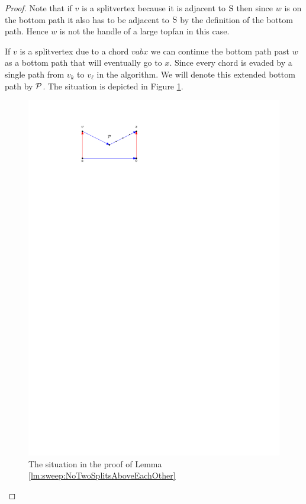  \begin{proof}
    Note that if $v$ is a splitvertex because it is adjacent to $\pS$ then since $w$ is on the bottom path it also has to be adjacent to $\pS$ by the definition of the bottom path.
    Hence $w$ is not the handle of a large topfan in this case.

    If $v$ is a splitvertex due to a chord $v a b x$ we can continue the bottom path past $w$ as a bottom path that will eventually go to $x$.
    Since every chord is evaded by a single path from $v_k$ to $v_\ell$ in the algorithm.
    We will denote this extended bottom path by $\P$.
    The situation is depicted in Figure \ref{fig:sweep:botomPathChord}.

    \begin{figure}[h]
      \centering
      \includegraphics[scale=1]{unifiedAlgo/img/sweep/bottompathChord.pdf}
      \caption{The situation in the proof of Lemma \ref{lm:sweep:NoTwoSplitsAboveEachOther}}
      \label{fig:sweep:botomPathChord}
    \end{figure}


\end{proof}
